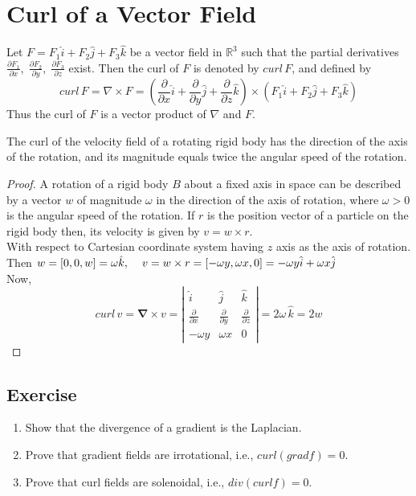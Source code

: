 \documentclass[aima331_lecturenotes_ku.tex]{subfiles}
\begin{document}
\section{Curl of a Vector Field}
\begin{mdframed}
  Let $F=F_1\hat{i} + F_2\hat{j} + F_3\hat{k}$ be a vector field in $\mathbb{R}^3$ such that the partial derivatives $\frac{\partial F_1}{\partial x}, \; \frac{\partial F_2}{\partial y}, \; \frac{\partial F_3}{\partial z}$ exist. Then the curl of $F$ is denoted by $curl \,F$, and defined by $$curl \, F = \nabla \times F = \left ( \frac{\partial }{\partial x} \hat{i} + \frac{\partial }{\partial y} \hat{j} + \frac{\partial }{\partial z} \hat{k} \right ) \times (F_1\hat{i} + F_2\hat{j} + F_3\hat{k})$$
  Thus the curl of $F$ is a vector product of $\nabla$ and $F$.
\end{mdframed}

\begin{theorem}
  The curl of the velocity field of a rotating rigid body has the direction of the axis of the rotation, and its magnitude equals twice the angular speed of the rotation.
\end{theorem}
\begin{proof}
  A rotation of a rigid body $B$ about a fixed axis in space can be described by a vector $w$ of magnitude $\omega$ in the direction of the axis of rotation, where $\omega > 0$ is the angular speed of the rotation. If $r$ is the position vector of a particle on the rigid body then, its velocity is given by $v=w\times r$. \\[1mm] With respect to Cartesian coordinate system having $z$ axis as the axis of rotation. Then $w=[0,0,w]=\omega \hat{k}, \hspace{4mm} v=w\times r=[-\omega y, \omega x, 0] = -\omega y \hat{i} + \omega x \hat{j}$ \\[1mm]
 Now, $$curl\, v = \mathbf \nabla \times v =
 \left | \begin{matrix}
   \hat{i} & \hat{j} & \hat{k} \\
   \frac{\partial}{\partial x} & \frac{\partial}{\partial y} & \frac{\partial}{\partial z} \\
   -\omega y & \omega x & 0
 \end{matrix} \right | = 2\omega \, \hat{k} = 2w
 $$
\end{proof}

\subsection{Exercise}
\begin{enumerate}
\item Show that the divergence of a gradient is the Laplacian.
\item Prove that gradient fields are irrotational, i.e., $curl(grad f)=0$.
\item Prove that curl fields are solenoidal, i.e., $div(curl f) =0$.
\end{enumerate}
\end{document}
